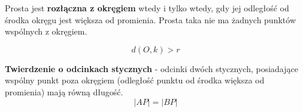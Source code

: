\documentclass[14pt,a4paper]{extarticle}
\begin{document}
\hfill\break
\noindent Prosta jest \textbf{rozłączna z okręgiem} wtedy i tylko wtedy, gdy jej odległość od środka
okręgu jest większa od promienia. Prosta taka nie ma żadnych punktów wspólnych z okręgiem.

$$d(O, k) > r$$

\newpage
\MoveBelowBox\unskip

\hfill\break
\noindent \textbf{Twierdzenie o odcinkach stycznych} - odcinki dwóch stycznych, posiadające wspólny
punkt poza okręgiem (odległość punktu od środka większa od promienia) mają równą długość.
$$\vert AP\vert = \vert BP\vert$$
\MoveBelowBox
\hfill\break

\end{document}
